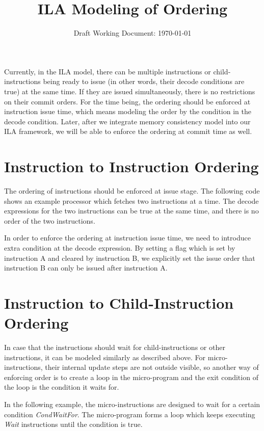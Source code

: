 \documentclass[letterpaper, 11 pt]{article}  %
\title{ILA Modeling of Ordering}
\author{}
\date{Draft Working Document: \today}
\begin{document}
\maketitle

\providecommand{\bd}[0]{\mathbb{B}}
\providecommand{\st}[1]{\mathrm{#1}}
\providecommand{\ft}[1]{\mathtt{#1}}


Currently, in the ILA model, there can be multiple instructions or child-instructions
being ready to issue (in other words, their decode conditions are true) at the same
time. If they are issued simultaneously, there is no restrictions on their commit
orders. For the time being, the ordering should be enforced at instruction issue time, which
means modeling the order by the condition in the decode condition. Later, after
we integrate memory consistency model into our ILA framework, we will be able to enforce
the ordering at commit time as well.

\section{Instruction to Instruction Ordering}
 
The ordering of instructions should be enforced at issue stage. The following code shows an 
example processor which fetches two instructions at a time. The decode expressions for the
two instructions can be true at the same time, and there is no order of the two instructions.



In order to enforce the ordering at instruction issue time, we need to introduce extra condition
at the decode expression. By setting a flag which is set by instruction A and cleared by instruction
B, we explicitly set the issue order that instruction B can only be issued after instruction
A.



\section{Instruction to Child-Instruction Ordering}

In case that the instructions should wait for child-instructions or other instructions, it can be 
modeled similarly as described above. For micro-instructions, their internal update steps are not 
outside visible, so another way of enforcing order is to create a loop in the micro-program and the
exit condition of the loop is the condition it waits for.

In the following example, the micro-instructions are designed to wait for a certain condition \textit{CondWaitFor}.
The micro-program forms a loop which keeps executing \textit{Wait} instructions until the condition
is true. 



%
%
\end{document}
